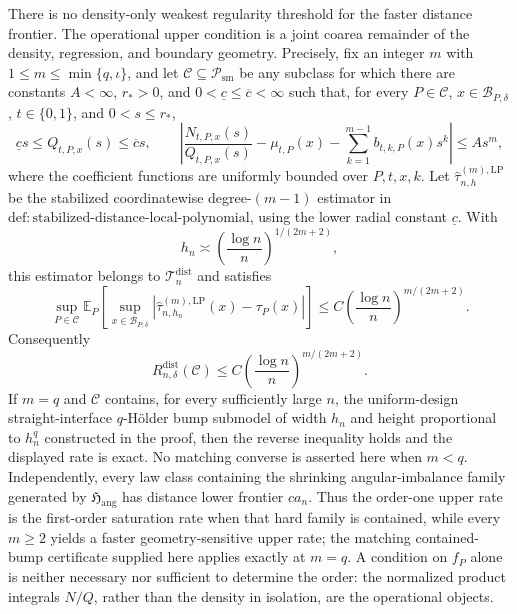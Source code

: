 There is no density-only weakest regularity threshold for the faster distance frontier.  The operational upper condition is a joint coarea remainder of the density, regression, and boundary geometry.  Precisely, fix an integer \(m\) with \(1\leq m\leq\min\{q,\iota\}\), and let \(\mathcal C\subseteq\mathcal P_{\mathrm{sm}}\) be any subclass for which there are constants \(A<\infty\), \(r_*>0\), and \(0<\underline c\leq\overline c<\infty\) such that, for every \(P\in\mathcal C\), \(x\in\mathcal B_{P,\delta}\), \(t\in\{0,1\}\), and \(0<s\leq r_*\),
\[
 \underline c s\leq Q_{t,P,x}(s)\leq\overline c s,
 \qquad
 \left|\frac{N_{t,P,x}(s)}{Q_{t,P,x}(s)}-\mu_{t,P}(x)-\sum_{k=1}^{m-1}b_{t,k,P}(x)s^k\right|\leq As^m,
\]
where the coefficient functions are uniformly bounded over \(P,t,x,k\).  Let \(\widehat\tau^{(m),\mathrm{LP}}_{n,h}\) be the stabilized coordinatewise degree-\((m-1)\) estimator in \(\mathrm{def:stabilized\text{-}distance\text{-}local\text{-}polynomial}\), using the lower radial constant \(\underline c\).  With
\[
 h_n\asymp\left(\frac{\log n}{n}\right)^{1/(2m+2)},
\]
this estimator belongs to \(\mathcal T_n^{\mathrm{dist}}\) and satisfies
\[
 \sup_{P\in\mathcal C}\mathbb E_P\!\left[
 \sup_{x\in\mathcal B_{P,\delta}}
 \left|\widehat\tau^{(m),\mathrm{LP}}_{n,h_n}(x)-\tau_P(x)\right|
 \right]
 \leq C\left(\frac{\log n}{n}\right)^{m/(2m+2)}.
\]
Consequently
\[
 R_{n,\delta}^{\mathrm{dist}}(\mathcal C)
 \leq C\left(\frac{\log n}{n}\right)^{m/(2m+2)}.
\]
If \(m=q\) and \(\mathcal C\) contains, for every sufficiently large \(n\), the uniform-design straight-interface \(q\)-H\"older bump submodel of width \(h_n\) and height proportional to \(h_n^q\) constructed in the proof, then the reverse inequality holds and the displayed rate is exact.  No matching converse is asserted here when \(m<q\).  Independently, every law class containing the shrinking angular-imbalance family generated by \(\mathfrak H_{\mathrm{ang}}\) has distance lower frontier \(ca_n\).  Thus the order-one upper rate is the first-order saturation rate when that hard family is contained, while every \(m\geq2\) yields a faster geometry-sensitive upper rate; the matching contained-bump certificate supplied here applies exactly at \(m=q\).  A condition on \(f_P\) alone is neither necessary nor sufficient to determine the order: the normalized product integrals \(N/Q\), rather than the density in isolation, are the operational objects.